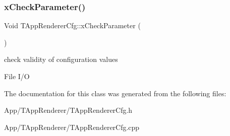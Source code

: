 \subsubsection{\texorpdfstring{x\+Check\+Parameter()}{xCheckParameter()}}
{\footnotesize\ttfamily Void T\+App\+Renderer\+Cfg\+::x\+Check\+Parameter (\begin{DoxyParamCaption}{ }\end{DoxyParamCaption})\hspace{0.3cm}{\ttfamily [protected]}}



check validity of configuration values 

File I/O 

The documentation for this class was generated from the following files\+:\begin{DoxyCompactItemize}
\item 
App/\+T\+App\+Renderer/T\+App\+Renderer\+Cfg.\+h\item 
App/\+T\+App\+Renderer/T\+App\+Renderer\+Cfg.\+cpp\end{DoxyCompactItemize}
